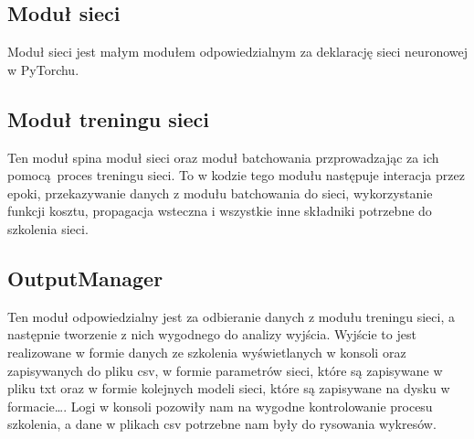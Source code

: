 \subsection{Moduł sieci} 
Moduł sieci jest małym modułem odpowiedzialnym za deklarację sieci neuronowej w PyTorchu.
 
\subsection{Moduł treningu sieci}
Ten moduł spina moduł sieci oraz moduł batchowania przprowadzając za ich pomocą proces treningu sieci.
To w kodzie tego modułu następuje interacja przez epoki, przekazywanie danych z modułu batchowania 
do sieci, wykorzystanie funkcji kosztu, propagacja wsteczna i wszystkie inne składniki potrzebne do 
szkolenia sieci. 

\subsection{OutputManager}
Ten moduł odpowiedzialny jest za odbieranie danych z modułu treningu sieci, a następnie tworzenie z nich
wygodnego do analizy wyjścia. Wyjście to jest realizowane w formie danych ze szkolenia wyświetlanych 
w konsoli oraz zapisywanych do pliku csv, w formie parametrów sieci, które są zapisywane
w pliku txt oraz w formie kolejnych modeli sieci, które są zapisywane na dysku w formacie\ldots.  
Logi w konsoli pozowiły nam na wygodne kontrolowanie procesu szkolenia, a dane w plikach csv potrzebne 
nam były do rysowania wykresów.

\newpage
